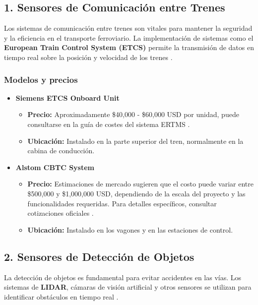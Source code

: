 \documentclass[journal]{IEEEtran}
\begin{document}
\subsection{1. Sensores de Comunicación entre Trenes}  

Los sistemas de comunicación entre trenes son vitales para mantener la seguridad y la eficiencia en el transporte ferroviario. La implementación de sistemas como el \textbf{European Train Control System (ETCS)} permite la transmisión de datos en tiempo real sobre la posición y velocidad de los trenes \cite{intel2022collision}.  

\subsubsection{Modelos y precios}  

\begin{itemize}  
    \item \textbf{Siemens ETCS Onboard Unit}   
    \begin{itemize}  
        \item \textbf{Precio:} Aproximadamente \$40,000 - \$60,000 USD por unidad, puede consultarse en la guía de costes del sistema ERTMS \cite{eu2021cost}.  
        \item \textbf{Ubicación:} Instalado en la parte superior del tren, normalmente en la cabina de conducción.  
    \end{itemize}  
    \item \textbf{Alstom CBTC System}  
        \begin{itemize}  
            \item \textbf{Precio:} Estimaciones de mercado sugieren que el costo puede variar entre \$500,000 y \$1,000,000 USD, dependiendo de la escala del proyecto y las funcionalidades requeridas. Para detalles específicos, consultar cotizaciones oficiales \cite{marketsandmarkets, railwaytech2019}.  
            \item \textbf{Ubicación:} Instalado en los vagones y en las estaciones de control.  
        \end{itemize}    
\end{itemize}  

\subsection{2. Sensores de Detección de Objetos}  

La detección de objetos es fundamental para evitar accidentes en las vías. Los sistemas de \textbf{LIDAR}, cámaras de visión artificial y otros sensores se utilizan para identificar obstáculos en tiempo real \cite{zhang2022}.  
\end{document}
